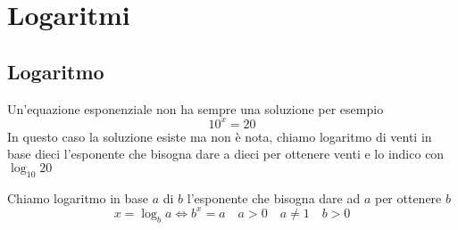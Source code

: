 \chapter{Logaritmi}
\label{sec:Logaritmi}
\section{Logaritmo}
\label{sec:Lograritmo}
Un'equazione esponenziale non ha sempre una soluzione per esempio \[10^x=20\] In questo caso la soluzione esiste ma non è nota, chiamo logaritmo di venti in base dieci l'esponente che bisogna dare a dieci per ottenere venti e lo indico con $\log_{10}20$
\begin{definizione}
	Chiamo logaritmo in base $a$ di $b$ l'esponente che bisogna dare ad $a$ per ottenere $b$ \[x=\log_ba\Leftrightarrow b^{x}=a\quad a>0\quad a\neq  1\quad b>0 \]
\end{definizione} 
